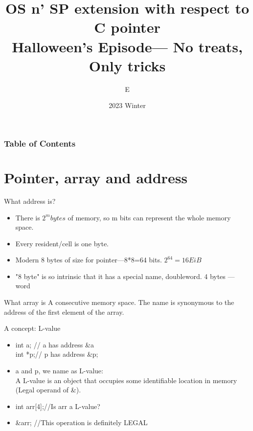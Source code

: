 \documentclass{beamer}
\title{OS n' SP extension with respect to C pointer \\{\small Halloween's Episode--- No treats, Only tricks}}
\author{E}
\institute{University of Birmingham}
\date{2023 Winter}
\begin{document}
\frame{\titlepage}

\begin{frame}
    \frametitle{Table of Contents}
    \tableofcontents
\end{frame}


\section{Pointer, array and address}
\begin{frame}{What address is?}
  \begin{itemize}
    \item <1->   There is $2^m bytes$ of memory, so m bits can represent the whole memory space. 
    \item <2-> Every resident/cell is one byte.
    \item<3-> Modern 8 bytes of size for pointer---8*8=64 bits. $2^64=16 EiB$
    \item <4->  "8 byte" is so intrinsic that it has a special name, doubleword. 4 bytes --- word
  \end{itemize}

\end{frame}

\begin{frame}{What array is}
  A consecutive memory space.
  The name is synonymous to the address of the first element of the array.
\end{frame}

\begin{frame}{A concept: L-value}
  \begin{itemize}
    \item <1->   
    int a; // a has address \&a  \\
    int *p;// p has address \&p;
    \item <2->
    a and p, we name as L-value:\\
    A L-value is an object that occupies some identifiable location in memory (Legal operand of \&).
    \item<3-> int arr[4];//Is arr a  L-value?
    \item <4-> \&arr; //This operation is definitely LEGAL
  \end{itemize}
  
\end{frame}
\end{document}
